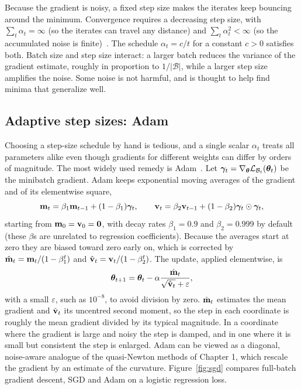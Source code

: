Because the gradient is noisy, a fixed step size makes the iterates keep bouncing around the minimum. Convergence requires a decreasing step size, with $\sum_t\alpha_t=\infty$ (so the iterates can travel any distance) and $\sum_t\alpha_t^2<\infty$ (so the accumulated noise is finite)~\citep{robbins1951}. The schedule $\alpha_t=c/t$ for a constant $c>0$ satisfies both. Batch size and step size interact: a larger batch reduces the variance of the gradient estimate, roughly in proportion to $1/|\mathcal{B}|$, while a larger step size amplifies the noise. Some noise is not harmful, and is thought to help find minima that generalize well.

\subsection{Adaptive step sizes: Adam}

Choosing a step-size schedule by hand is tedious, and a single scalar $\alpha_t$ treats all parameters alike even though gradients for different weights can differ by orders of magnitude. The most widely used remedy is Adam~\citep{kingma2015}. Let $\boldsymbol{\gamma}_t=\nabla_{\boldsymbol{\theta}}\mathcal{L}_{\mathcal{B}_t}(\boldsymbol{\theta}_t)$ be the minibatch gradient. Adam keeps exponential moving averages of the gradient and of its elementwise square,
\begin{equation}
  \mathbf{m}_t = \beta_1\mathbf{m}_{t-1} + (1-\beta_1)\boldsymbol{\gamma}_t, \qquad \mathbf{v}_t = \beta_2\mathbf{v}_{t-1} + (1-\beta_2)\boldsymbol{\gamma}_t\odot\boldsymbol{\gamma}_t,
\end{equation}
starting from $\mathbf{m}_0=\mathbf{v}_0=\mathbf{0}$, with decay rates $\beta_1=0.9$ and $\beta_2=0.999$ by default (these $\beta$s are unrelated to regression coefficients). Because the averages start at zero they are biased toward zero early on, which is corrected by $\hat{\mathbf{m}}_t=\mathbf{m}_t/(1-\beta_1^t)$ and $\hat{\mathbf{v}}_t=\mathbf{v}_t/(1-\beta_2^t)$. The update, applied elementwise, is
\begin{equation}
  \boldsymbol{\theta}_{t+1} = \boldsymbol{\theta}_t - \alpha\frac{\hat{\mathbf{m}}_t}{\sqrt{\hat{\mathbf{v}}_t}+\varepsilon},
\end{equation}
with a small $\varepsilon$, such as $10^{-8}$, to avoid division by zero. $\hat{\mathbf{m}}_t$ estimates the mean gradient and $\hat{\mathbf{v}}_t$ its uncentred second moment, so the step in each coordinate is roughly the mean gradient divided by its typical magnitude. In a coordinate where the gradient is large and noisy the step is damped, and in one where it is small but consistent the step is enlarged. Adam can be viewed as a diagonal, noise-aware analogue of the quasi-Newton methods of Chapter 1, which rescale the gradient by an estimate of the curvature. Figure~\ref{fig:sgd} compares full-batch gradient descent, SGD and Adam on a logistic regression loss.

